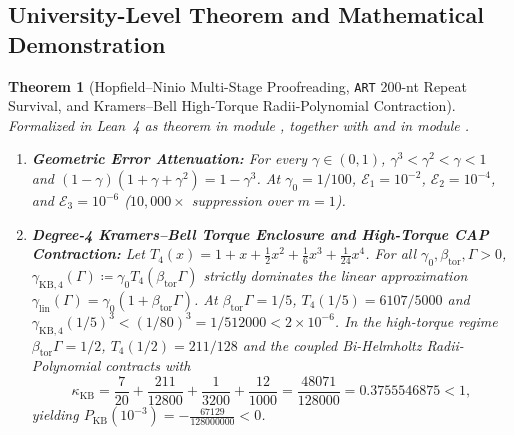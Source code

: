 \documentclass[11pt,a4paper]{article}
\newtheorem{theorem}{Theorem}[section]
\theoremstyle{definition}
\theoremstyle{remark}
\begin{document}
\subsection{University-Level Theorem and Mathematical Demonstration}

\begin{theorem}[Hopfield--Ninio Multi-Stage Proofreading, \texttt{ART} 200-nt Repeat Survival, and Kramers--Bell High-Torque Radii-Polynomial Contraction]
\label{thm:sec4_hopfield_kramers}
Formalized in Lean~4 as theorem  in module , together with  and  in module .
\begin{enumerate}
  \item \textbf{Geometric Error Attenuation:} For every $\gamma \in (0, 1)$, $\gamma^3 < \gamma^2 < \gamma < 1$ and $(1 - \gamma)(1 + \gamma + \gamma^2) = 1 - \gamma^3$. At $\gamma_0 = 1/100$, $\mathcal{E}_1 = 10^{-2}$, $\mathcal{E}_2 = 10^{-4}$, and $\mathcal{E}_3 = 10^{-6}$ ($10{,}000\times$ suppression over $m=1$).
  \item \textbf{Degree-4 Kramers--Bell Torque Enclosure and High-Torque CAP Contraction:} Let $T_4(x) = 1 + x + \frac{1}{2}x^2 + \frac{1}{6}x^3 + \frac{1}{24}x^4$. For all $\gamma_0, \beta_{\mathrm{tor}}, \Gamma > 0$, $\gamma_{\mathrm{KB},4}(\Gamma) \coloneqq \gamma_0 T_4(\beta_{\mathrm{tor}}\Gamma)$ strictly dominates the linear approximation $\gamma_{\mathrm{lin}}(\Gamma) = \gamma_0(1 + \beta_{\mathrm{tor}}\Gamma)$. At $\beta_{\mathrm{tor}}\Gamma = 1/5$, $T_4(1/5) = 6107/5000$ and $\gamma_{\mathrm{KB},4}(1/5)^3 < (1/80)^3 = 1/512000 < 2\times 10^{-6}$. In the high-torque regime $\beta_{\mathrm{tor}}\Gamma = 1/2$, $T_4(1/2) = 211/128$ and the coupled Bi-Helmholtz Radii-Polynomial contracts with
  \begin{equation}
    \kappa_{\mathrm{KB}} = \frac{7}{20} + \frac{211}{12800} + \frac{1}{3200} + \frac{12}{1000} = \frac{48071}{128000} = 0.3755546875 < 1,
  \end{equation}
  yielding $P_{\mathrm{KB}}(10^{-3}) = -\frac{67129}{128000000} < 0$.
\end{enumerate}
\end{theorem}
\end{document}
